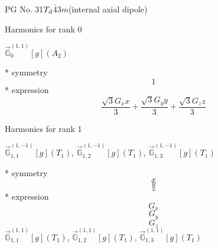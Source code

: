 \documentclass[fleqn,8pt]{jsarticle}
\begin{document}
\setcounter{MaxMatrixCols}{32}

\renewcommand{\tablename}{Table~}
\renewcommand{\figurename}{Figure~}
\begin{center}
\LARGE
PG No. 31\quad$T_{\rm d}$\quad$\bar{4}3m$\quad[ cubic ] (internal axial dipole)
\end{center}

\noindent * Harmonics for rank 0

\noindent\quad $\vec{\mathbb{G}}_{0}^{(1,1)}[g](A_{2})$

\noindent\quad ** symmetry
\begin{dmath*}
1
\end{dmath*}
\noindent\quad ** expression
\begin{dmath*}
\frac{\sqrt{3} G_{x} x}{3} + \frac{\sqrt{3} G_{y} y}{3} + \frac{\sqrt{3} G_{z} z}{3}
\end{dmath*}

\noindent * Harmonics for rank 1

\noindent\quad $\vec{\mathbb{G}}_{1,1}^{(1,-1)}[g](T_{1})$, $\vec{\mathbb{G}}_{1,2}^{(1,-1)}[g](T_{1})$, $\vec{\mathbb{G}}_{1,3}^{(1,-1)}[g](T_{1})$

\noindent\quad ** symmetry
\begin{dmath*}
x
\end{dmath*}
\begin{dmath*}
y
\end{dmath*}
\begin{dmath*}
z
\end{dmath*}
\noindent\quad ** expression
\begin{dmath*}
G_{x}
\end{dmath*}
\begin{dmath*}
G_{y}
\end{dmath*}
\begin{dmath*}
G_{z}
\end{dmath*}
\noindent\quad $\vec{\mathbb{G}}_{1,1}^{(1,1)}[g](T_{1})$, $\vec{\mathbb{G}}_{1,2}^{(1,1)}[g](T_{1})$, $\vec{\mathbb{G}}_{1,3}^{(1,1)}[g](T_{1})$
\end{document}
